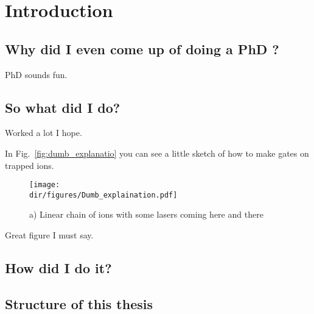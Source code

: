 \chapter{Introduction}
\label{ch:introduction}


\section{Why did I even come up of doing a PhD ?}

PhD sounds fun\cite{Article1:1990}.

\section{So what did I do?}

Worked a lot I hope.

\lipsum[1-6]

In Fig.~\ref{fig:dumb_explanatio} you can see a little sketch of how to make gates on trapped ions.

\begin{figure}[t]
	\centering
	\texttt{[image: \\dir/figures/Dumb\_explaination.pdf]}
	\caption{a) Linear chain of ions with some lasers coming here and there}
	\label{fig:dumb_explanation}
\end{figure}

Great figure I must say.


\section{How did I do it?}
\lipsum[2-4]

\section{Structure of this thesis}

\lipsum[1-6]
